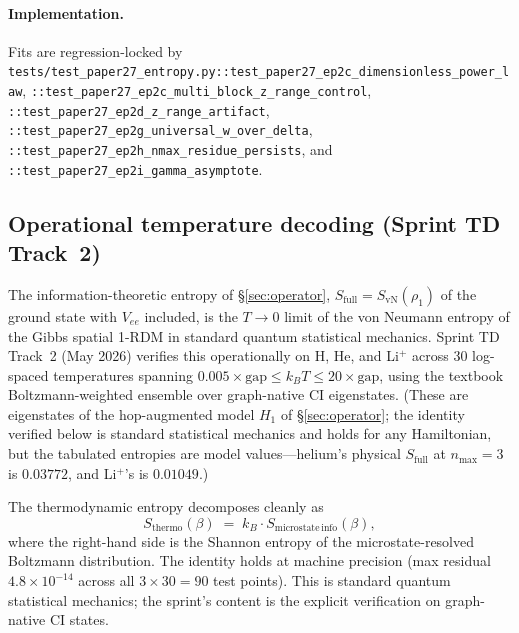 \documentclass[twocolumn,pra,amsmath,amssymb,superscriptaddress]{revtex4-2}
\begin{document}
\paragraph*{Implementation.}  Fits are regression-locked by
\texttt{tests/test\_paper27\_entropy.py::test\_paper27\_ep2c\_dimensionless\_power\_law},
\texttt{::test\_paper27\_ep2c\_multi\_block\_z\_range\_control},
\texttt{::test\_paper27\_ep2d\_z\_range\_artifact},
\texttt{::test\_paper27\_ep2g\_universal\_w\_over\_delta},
\texttt{::test\_paper27\_ep2h\_nmax\_residue\_persists},
and
\texttt{::test\_paper27\_ep2i\_gamma\_asymptote}.


\subsection{Operational temperature decoding (Sprint TD Track~2)}
\label{sec:operational_temp_decoding}

The information-theoretic entropy of \S\ref{sec:operator},
$S_{\mathrm{full}} = S_{\mathrm{vN}}(\rho_1)$ of the ground state
with $V_{ee}$ included, is the $T \to 0$ limit of the von Neumann entropy of
the Gibbs spatial 1-RDM in standard quantum statistical mechanics.
Sprint TD Track~2 (May 2026) verifies this operationally on
H, He, and Li$^+$ across 30 log-spaced temperatures spanning
$0.005\times\mathrm{gap} \leq k_B T \leq 20\times\mathrm{gap}$, using
the textbook Boltzmann-weighted ensemble over graph-native CI
eigenstates.  (These are eigenstates of the hop-augmented model
$H_1$ of \S\ref{sec:operator}; the identity verified below is standard
statistical mechanics and holds for any Hamiltonian, but the tabulated
entropies are model values---helium's physical $S_{\mathrm{full}}$ at
$n_{\max}=3$ is $0.03772$, and Li$^+$'s is $0.01049$.)

The thermodynamic entropy decomposes cleanly as
\begin{equation}
\label{eq:apparatus_identity}
S_{\mathrm{thermo}}(\beta) \;=\; k_B \cdot S_{\mathrm{microstate\,info}}(\beta),
\end{equation}
where the right-hand side is the Shannon entropy of the
microstate-resolved Boltzmann distribution.  The identity holds at
machine precision (max residual $4.8\times 10^{-14}$ across all
$3\times 30 = 90$ test points).  This is standard quantum statistical
mechanics; the sprint's content is the explicit verification on
graph-native CI states.
\end{document}
